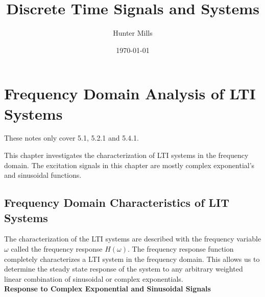 \documentclass{article} %
\title{Discrete Time Signals and Systems} %
\author{Hunter Mills} %
\date{\today} %
\begin{document}
    \maketitle %
    
    \section{Frequency Domain Analysis of LTI Systems} %
    These notes only cover 5.1, 5.2.1 and 5.4.1.
    
    This chapter investigates the characterization of LTI systems in the frequency domain. The excitation signals in this chapter are mostly complex exponential's and sinusoidal functions. 
    \subsection{Frequency Domain Characteristics of LIT Systems}
    The characterization of the LTI systems are described with the frequency variable $\omega$ called the frequency response $H(\omega)$. The frequency response function completely characterizes a LTI system in the frequency domain. This allows us to determine the steady state response of the system to any arbitrary weighted linear combination of sinusoidal or complex exponentials. \\
    \textbf{Response to Complex Exponential and Sinusoidal Signals}\\
    
\end{document}
